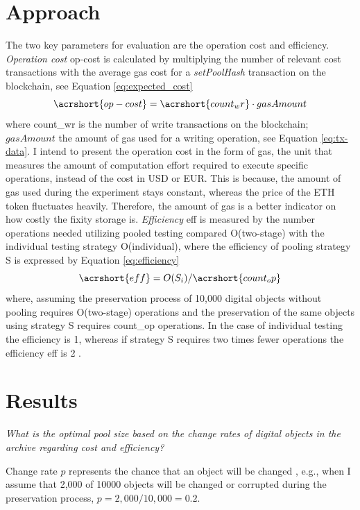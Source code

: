 \section{Approach}
The two key parameters for evaluation are the operation cost and efficiency. 
\textit{Operation cost} \acrshort{op-cost} is calculated by multiplying the number of relevant cost transactions with the average gas cost for a \textit{setPoolHash} transaction on the blockchain, see Equation \ref{eq:expected_cost}
\begin{equation}\label{eq:expected_cost}
    \acrshort{op-cost} = \acrshort{count_wr} \cdot gasAmount
\end{equation}
where \acrshort{count_wr} is the number of write transactions on the blockchain; $gasAmount$ the amount of gas used for a writing operation, see Equation \ref{eq:tx-data}.
I intend to present the operation cost in the form of gas, the unit that measures the amount of computation effort required to execute specific operations, instead of the cost in USD or EUR. This is because, the amount of gas used during the experiment stays constant, whereas the price of the ETH token fluctuates heavily. Therefore, the amount of gas is a better indicator on how costly the fixity storage is.
\textit{Efficiency} \acrshort{eff} is measured by the number operations needed utilizing pooled testing compared O(\acrshort{two-stage}) with the individual testing strategy O(\acrshort{individual}), where the efficiency of pooling strategy S is expressed by Equation \ref{eq:efficiency}
\begin{equation}\label{eq:efficiency}
    \acrshort{eff} = O(S_{i})/\acrshort{count_op}
\end{equation}
where, assuming the preservation process of 10,000 digital objects without pooling requires O(\acrshort{two-stage}) operations and the preservation of the same objects using strategy S requires \acrshort{count_op} operations. In the case of individual testing the efficiency is 1, whereas if strategy S requires two times fewer operations the efficiency \acrshort{eff} is 2 \cite[4]{vzilinskas2021pooled}.
\section{Results}

\textit{What is the optimal pool size based on the change rates of digital objects in the archive regarding cost and efficiency?}

Change rate $p$ represents the chance that an object will be changed , e.g., when I assume that 2,000 of 10000 objects will be changed or corrupted during the preservation process, $p = 2,000/10,000 = 0.2$. 

